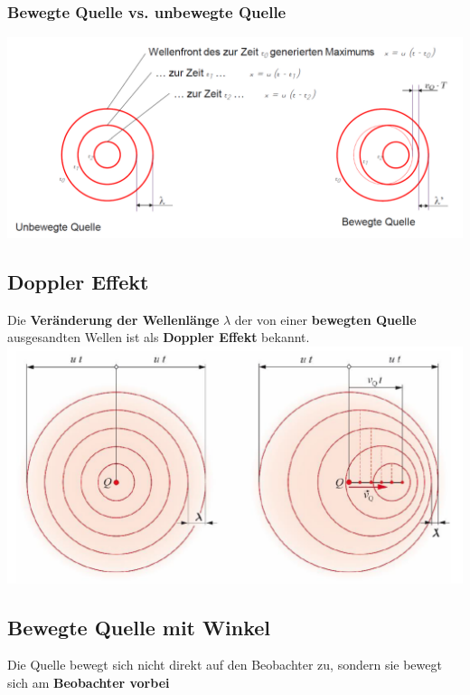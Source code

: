 \subsubsection{Bewegte Quelle vs. unbewegte Quelle}

\includegraphics[width=0.98\linewidth]{Bilder/Wellen-Optik/Unbewegte_Quelle}





\subsection{Doppler Effekt}
Die \textbf{Veränderung der Wellenlänge} $\lambda$ der von einer \textbf{bewegten Quelle} ausgesandten Wellen ist als \textbf{Doppler Effekt} bekannt.  \\

\includegraphics[width=0.8\linewidth]{Bilder/Wellen-Optik/Doppler_effekt}



\subsection{Bewegte Quelle mit Winkel}\label{bewegte-Quelle-mit-Winkel}
Die Quelle bewegt sich nicht direkt auf den Beobachter zu, sondern sie bewegt sich am \textbf{Beobachter vorbei} \\


